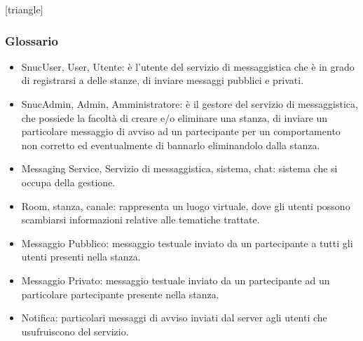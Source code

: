 [triangle]
\begin{frame} [allowframebreaks]
  \frametitle{Glossario} 
   \begin{itemize} 
    \item SnucUser, User, Utente: è l'utente del servizio di messaggistica che è in grado di registrarsi a delle stanze, di inviare messaggi pubblici e privati.
    \item SnucAdmin, Admin, Amministratore: è il gestore del servizio di messaggistica, che possiede la facoltà di creare e/o eliminare una stanza, di inviare un 
          particolare messaggio di avviso ad un partecipante per un comportamento non corretto ed eventualmente di bannarlo eliminandolo dalla stanza.
    \item Messaging Service, Servizio di messaggistica, sistema, chat: sistema che si occupa della gestione.
    \item Room, stanza, canale: rappresenta un luogo virtuale, dove gli utenti possono scambiarsi informazioni relative alle tematiche trattate.
    \item Messaggio Pubblico: messaggio testuale inviato da un partecipante a tutti gli utenti presenti nella stanza.
    \item Messaggio Privato: messaggio testuale inviato da un partecipante ad un particolare partecipante presente nella stanza.
    \item Notifica: particolari messaggi di avviso inviati dal server agli utenti che usufruiscono del servizio.  
  \end{itemize}
\end{frame}

